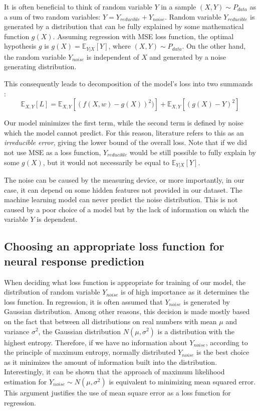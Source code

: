 It is often beneficial to think of random variable $Y$ in a sample $(X, Y) \sim P_{data}$ as a sum of two random variables: $Y = Y_{reducible} + Y_{noise}$. Random variable $Y_{reducible}$ is generated by a distribution that can be fully explained by some mathematical function $g(X)$. Assuming regression with MSE loss function, the optimal hypothesis $g$ is $g(X) = \mathbb{E}_{Y|X}[Y]$, where $(X, Y) \sim P_{data}$. On the other hand, the random variable $Y_{noise}$ is independent of $X$ and generated by a noise generating distribution. 

This consequently leads to decomposition of the model’s loss into two summands \citep{bishop2006pattern}:
\begin{equation}
\mathbb{E}_{X, Y}[L] = 
\mathbb{E}_{X, Y}[(f(X, w) - g(X))^2)] + 
\mathbb{E}_{X, Y}[(g(X) - Y)^2]
\end{equation}

Our model minimizes the first term, while the second term is defined by noise which the model cannot predict. For this reason, literature refers to this as an \emph{irreducible error}, giving the lower bound of the overall loss. Note that if we did not use MSE as a loss function, $Y_{reducible}$ would be still possible to fully explain by some $g(X)$, but it would not necessarily be equal to $\mathbb{E}_{Y|X}[Y]$.

The noise can be caused by the measuring device, or more importantly, in our case, it can depend on some hidden features not provided in our dataset. The machine learning model can never predict the noise distribution. This is not caused by a poor choice of a model but by the lack of information on which the variable $Y$ is dependent.

\subsection{Choosing an appropriate loss function for neural response prediction}\label{appropriate-loss}

When deciding what loss function is appropriate for training of our model, the distribution of random variable $Y_{noise}$ is of high importance as it determines the loss function. In regression, it is often assumed that $Y_{noise}$ is generated by Gaussian distribution. Among other reasons, this decision is made mostly based on the fact that between all distributions on real numbers with mean $\mu$ and variance $\sigma^2$, the Gaussian distribution $N(\mu, \sigma^2)$ is a distribution with the highest entropy. Therefore, if we have no information about $Y_{noise}$, according to the principle of maximum entropy, normally distributed $Y_{noise}$ is the best choice as it minimizes the amount of information built into the distribution. Interestingly, it can be shown that the approach of maximum likelihood estimation for $Y_{noise} \sim N(\mu, \sigma^2)$ is equivalent to minimizing mean squared error. This argument justifies the use of mean square error as a loss function for regression.


